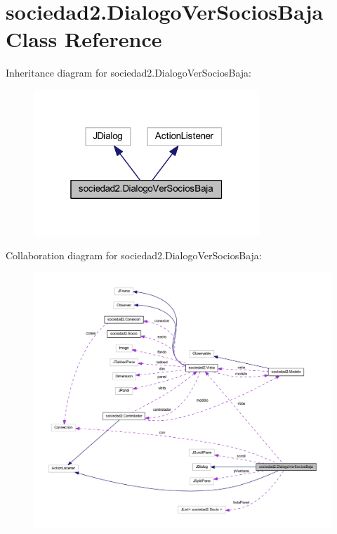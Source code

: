 \hypertarget{classsociedad2_1_1_dialogo_ver_socios_baja}{}\section{sociedad2.\+Dialogo\+Ver\+Socios\+Baja Class Reference}
\label{classsociedad2_1_1_dialogo_ver_socios_baja}


Inheritance diagram for sociedad2.\+Dialogo\+Ver\+Socios\+Baja\+:
\nopagebreak
\begin{figure}[H]
\begin{center}
\leavevmode
\includegraphics[width=241pt]{classsociedad2_1_1_dialogo_ver_socios_baja__inherit__graph}
\end{center}
\end{figure}


Collaboration diagram for sociedad2.\+Dialogo\+Ver\+Socios\+Baja\+:
\nopagebreak
\begin{figure}[H]
\begin{center}
\leavevmode
\includegraphics[width=350pt]{classsociedad2_1_1_dialogo_ver_socios_baja__coll__graph}
\end{center}
\end{figure}
